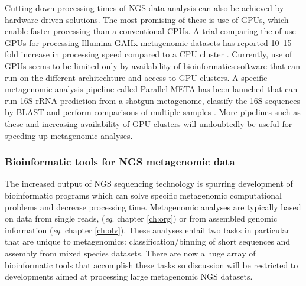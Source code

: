 Cutting down processing times of \ac{NGS} data analysis can also be achieved by hardware-driven solutions.
The most promising of these is use of \acp{GPU}, which enable faster processing than a conventional \acp{CPU}.
A trial comparing the of use \acp{GPU} for processing Illumina GAIIx metagenomic datasets has reported 10--15 fold increase in processing speed compared to a \ac{CPU} cluster \cite{Su2012}.
Currently, use of \acp{GPU} seems to be limited only by availability of bioinformatics software that can run on the different architechture and access to \ac{GPU} clusters.
A specific metagenomic analysis pipeline called Parallel-META has been launched that can run 16S \acs{rRNA} prediction from a shotgun metagenome, classify the 16S sequences by \acs{BLAST} and perform comparisons of multiple samples \cite{Su2012}.
More pipelines such as these and increasing availability of \ac{GPU} clusters will undoubtedly be useful for speeding up metagenomic analyses.

\subsubsection{Bioinformatic tools for \acs{NGS} metagenomic data}
The increased output of \ac{NGS} sequencing technology is spurring development of bioinformatic programs which can solve specific metagenomic computational problems and decrease processing time.
Metagenomic analyses are typically based on data from single reads, (\emph{eg}. chapter \ref{ch:org}) or from assembled genomic information (\emph{eg}. chapter \ref{ch:olv}).
These analyses entail two tasks in particular that are unique to metagenomics: classification/binning of short sequences and assembly from mixed species datasets. 
There are now a huge array of bioinformatic tools that accomplish these tasks so discussion will be restricted to developments aimed at processing large metagenomic \ac{NGS} datasets.

